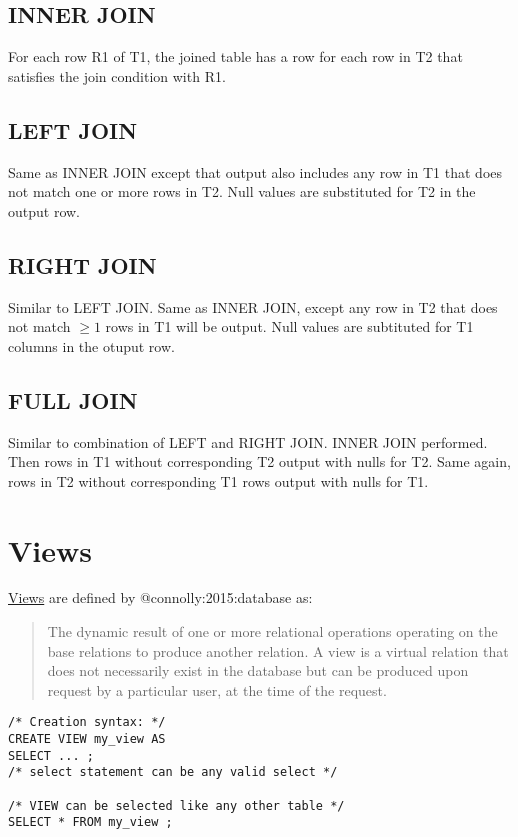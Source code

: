 \documentclass[slides]{pgnotes}
\begin{document}
\subsection{INNER JOIN}\label{inner-join}

For each row R1 of T1, the joined table has a row for each row in T2
that satisfies the join condition with R1.

\subsection{LEFT JOIN}\label{left-join}

Same as INNER JOIN except that output also includes any row in T1 that
does not match one or more rows in T2. Null values are substituted for
T2 in the output row.

\subsection{RIGHT JOIN}\label{right-join}

Similar to LEFT JOIN. Same as INNER JOIN, except any row in T2 that does
not match \(\ge 1\) rows in T1 will be output. Null values are
subtituted for T1 columns in the otuput row.

\subsection{FULL JOIN}\label{full-join}

Similar to combination of LEFT and RIGHT JOIN. INNER JOIN performed.
Then rows in T1 without corresponding T2 output with nulls for T2. Same
again, rows in T2 without corresponding T1 rows output with nulls for
T1.


\section{Views}\label{sec:views}

\href{https://www.postgresql.org/docs/13/tutorial-views.html}{Views} are
defined by @connolly:2015:database as:

\begin{quote}
The dynamic result of one or more relational operations operating on the
base relations to produce another relation. A view is a virtual relation
that does not necessarily exist in the database but can be produced upon
request by a particular user, at the time of the request.
\end{quote}

\begin{verbatim}
/* Creation syntax: */
CREATE VIEW my_view AS
SELECT ... ;
/* select statement can be any valid select */

/* VIEW can be selected like any other table */
SELECT * FROM my_view ; 
\end{verbatim}
\end{document}
